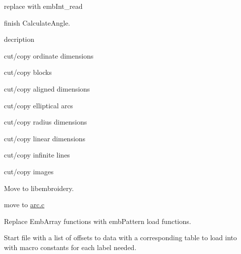 \begin{DoxyRefList}
%
replace with emb\+Int\+\_\+read  
\item[Global \mbox{\hyperlink{src_2main_8c_a6d3433fd7ebb707563972aad2dbb0d54}{calculate\+\_\+angle}} (Emb\+Real x1, Emb\+Real y1, Emb\+Real x2, Emb\+Real y2)]\label{todo__todo000202}%
%
finish Calculate\+Angle.  
\item[Global \mbox{\hyperlink{extern_2libembroidery_2src_2main_8c_a5d7bf5f964ae87921bab916b871ea2dd}{copy\+\_\+trim}} (char const $\ast$s)]\label{todo__todo000423}%
%
decription  
\item[Global \mbox{\hyperlink{src_2main_8c_adce5db5dd1e8ab7e28b2908953bed991}{create\+Object\+List}} (Emb\+Array $\ast$list)]\label{todo__todo000065}%
%
cut/copy ordinate dimensions

\label{todo__todo000059}%
%
cut/copy blocks

\label{todo__todo000060}%
%
cut/copy aligned dimensions

\label{todo__todo000061}%
%
cut/copy elliptical arcs

\label{todo__todo000066}%
%
cut/copy radius dimensions 

\label{todo__todo000064}%
%
cut/copy linear dimensions

\label{todo__todo000063}%
%
cut/copy infinite lines

\label{todo__todo000062}%
%
cut/copy images 
\item[Global \mbox{\hyperlink{src_2main_8c_a1291ffefd4b741c0b342ed03934c431d}{emb\+\_\+clamp}} (Emb\+Real lower, Emb\+Real x, Emb\+Real upper)]\label{todo__todo000008}%
%
Move to libembroidery.  
\item[Global \mbox{\hyperlink{extern_2libembroidery_2src_2main_8c_a16e1e46c5c33874fc9a63476e70c0d66}{emb\+Arc\+\_\+print}} (Emb\+Arc arc)]\label{todo__todo000422}%
%
move to \mbox{\hyperlink{arc_8c}{arc.\+c}}  
\item[Page \mbox{\hyperlink{md_extern_libembroidery_src_embedded}{embedded}} ]\label{todo__todo000396}%
%
Replace Emb\+Array functions with emb\+Pattern load functions.

\label{todo__todo000397}%
%
Start file with a list of offsets to data with a corresponding table to load into with macro constants for each label needed.


\end{DoxyRefList}
